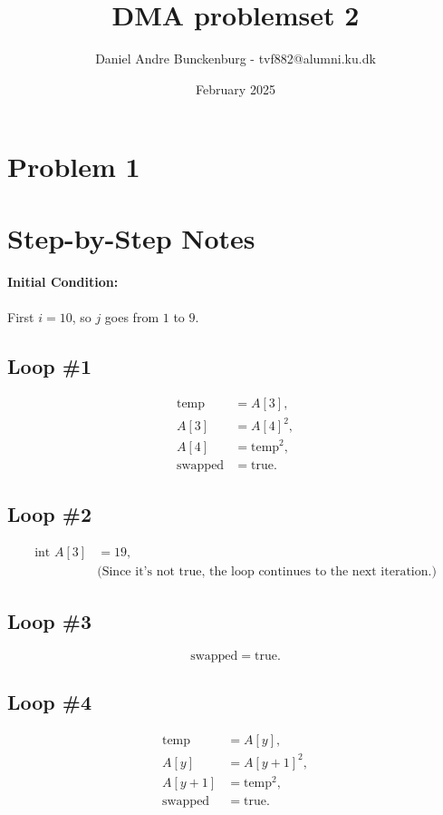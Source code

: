 \documentclass{article}
\title{DMA problemset 2}
\author{Daniel Andre Bunckenburg - tvf882@alumni.ku.dk}
\date{February 2025}
\theoremstyle{remark}
\begin{document}
\maketitle

\section{Problem 1}

\section*{Step-by-Step Notes}

\paragraph{Initial Condition:}
First $i = 10$, so $j$ goes from $1$ to $9$.

\subsection*{Loop \#1}
\begin{align*}
\text{temp} &= A[3], \\
A[3] &= A[4]^2, \\
A[4] &= \text{temp}^2, \\
\text{swapped} &= \text{true}.
\end{align*}

\subsection*{Loop \#2}
\begin{align*}
\text{int } A[3] &= 19, \\
&\text{(Since it's not true, the loop continues to the next iteration.)}
\end{align*}

\subsection*{Loop \#3}
\[
  \text{swapped} = \text{true}.
\]

\subsection*{Loop \#4}
\begin{align*}
\text{temp} &= A[y], \\
A[y] &= A[y+1]^2, \\
A[y+1] &= \text{temp}^2, \\
\text{swapped} &= \text{true}.
\end{align*}
\end{document}

